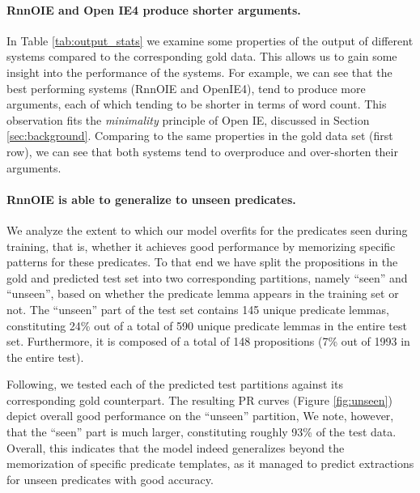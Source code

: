 \paragraph{RnnOIE and Open IE4 produce shorter arguments.}
In Table \ref{tab:output_stats} we examine some properties of the output of different systems compared to the corresponding gold data.
This allows us to gain some insight into the performance of the systems.
For example, we can see that the best performing systems (RnnOIE and OpenIE4), tend to produce
more arguments, each of which tending to be shorter in terms of word count.
This observation fits the \emph{minimality} principle of Open IE, discussed in Section \ref{sec:background}.
Comparing to the same properties in the gold data set (first row), we can see that both systems
tend to overproduce and over-shorten their arguments.

\paragraph{RnnOIE is able to generalize to unseen predicates.}
We analyze the extent to which our model overfits for the predicates seen during training, that is, whether it achieves good performance by memorizing specific patterns for these predicates.
To that end we have split the propositions in the gold and predicted test set into two corresponding partitions, namely ``seen'' and ``unseen'',
based on whether the predicate lemma appears in the training set or not.
The ``unseen'' part of the test set contains 145 unique predicate lemmas, constituting
24\% out of a total of 590 unique predicate lemmas in the entire test set.
Furthermore, it is composed of a total of 148 propositions (7\% out of 1993 in the entire test).

Following, we tested each of the predicted test partitions against its corresponding gold
counterpart.
The resulting PR curves (Figure \ref{fig:unseen}) depict overall good performance on the ``unseen'' partition,
We note, however, that the ``seen'' part is much larger, constituting roughly 93\% of the test data.
Overall, this indicates that the model indeed generalizes beyond the memorization of specific predicate templates, as
it managed to predict extractions for unseen predicates with good accuracy.


